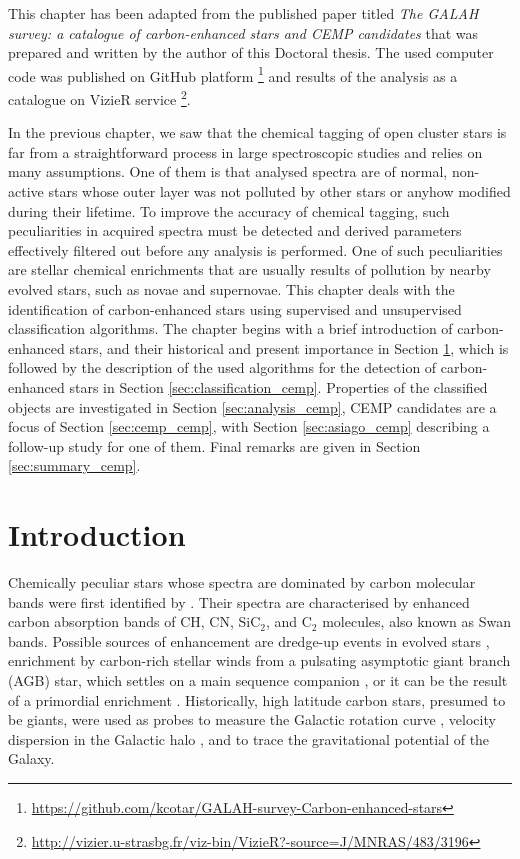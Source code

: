This chapter has been adapted from the published paper titled \textit{The GALAH survey: a catalogue of carbon-enhanced stars and CEMP candidates} \cite{2019MNRAS.483.3196C} that was prepared and written by the author of this Doctoral thesis. The used computer code was published on GitHub platform  \footnote{\url{https://github.com/kcotar/GALAH-survey-Carbon-enhanced-stars}} and results of the analysis as a catalogue on VizieR service  \footnote{\url{http://vizier.u-strasbg.fr/viz-bin/VizieR?-source=J/MNRAS/483/3196}}.

In the previous chapter, we saw that the chemical tagging of open cluster stars is far from a straightforward process in large spectroscopic studies and relies on many assumptions. One of them is that analysed spectra are of normal, non-active stars whose outer layer was not polluted by other stars or anyhow modified during their lifetime. To improve the accuracy of chemical tagging, such peculiarities in acquired spectra must be detected and derived parameters effectively filtered out before any analysis is performed. One of such peculiarities are stellar chemical enrichments that are usually results of pollution by nearby evolved stars, such as novae and supernovae. This chapter deals with the identification of carbon-enhanced stars using supervised and unsupervised classification algorithms. The chapter begins with a brief introduction of carbon-enhanced stars, and their historical and present importance in Section \ref{sec:intro_cemp}, which is followed by the description of the used algorithms for the detection of carbon-enhanced stars in Section \ref{sec:classification_cemp}. Properties of the classified objects are investigated in Section \ref{sec:analysis_cemp}, CEMP candidates are a focus of Section \ref{sec:cemp_cemp}, with Section \ref{sec:asiago_cemp} describing a follow-up study for one of them. Final remarks are given in Section \ref{sec:summary_cemp}.

\section{Introduction}
\label{sec:intro_cemp}
Chemically peculiar stars whose spectra are dominated by carbon molecular bands were first identified by \citet{1869AN.....73..129S}. Their spectra are characterised by enhanced carbon absorption bands of CH, CN, SiC$_2$, and C$_{2}$ molecules, also known as Swan bands. Possible sources of enhancement are dredge-up events in evolved stars \cite{1983ApJ...275L..65I}, enrichment by carbon-rich stellar winds from a pulsating asymptotic giant branch (AGB) star, which settles on a main sequence companion \cite{1995MNRAS.277.1443H}, or it can be the result of a primordial enrichment \cite{2016ApJ...833...20Y}. Historically, high latitude carbon stars, presumed to be giants, were used as probes to measure the Galactic rotation curve \cite{2013Ap.....56...68B}, velocity dispersion in the Galactic halo \cite{1991AJ....101.2220B}, and to trace the gravitational potential of the Galaxy.  

